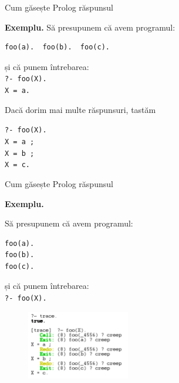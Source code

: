 \documentclass[xcolor=pdftex,romanian,colorlinks]{beamer}
\begin{document}
\begin{frame}[fragile]{Cum găsește Prolog răspunsul}


\textbf{\color{True} Exemplu.} Să presupunem că avem programul: 
\begin{verbatim}
foo(a).  foo(b).  foo(c).
\end{verbatim}
și că punem întrebarea: \\
{\color{blue}\texttt{?- foo(X).}}\\
{\color{blue}\texttt{X = a.}}\\

\smallskip 

Dacă dorim mai multe răspunsuri, tastăm \color{blue}{\texttt{;}}\\
\smallskip

{\color{blue}\texttt{?- foo(X).}}\\
{\color{blue}\texttt{X = a ;}}\\
{\color{blue}\texttt{X = b ;}}\\
{\color{blue}\texttt{X = c.}}



\end{frame}

\addtocounter{framenumber}{-1}
\begin{frame}[fragile]{Cum găsește Prolog răspunsul}


\textbf{\color{True} Exemplu.} 
\begin{multicols}{2}
Să presupunem că avem programul: 
\begin{verbatim}
foo(a). 
foo(b). 
foo(c).
\end{verbatim}
și că punem întrebarea: \\
{\color{blue}\texttt{?- foo(X).}}
\columnbreak
\begin{figure}[h]
    \includegraphics[width=0.4\textwidth]{images/trace1}
\end{figure}
\end{multicols}

\end{frame}

\end{document}

